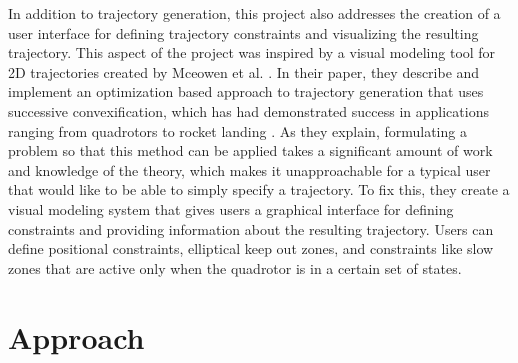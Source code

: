 \documentclass[pageno]{jpaper}
\begin{document}
In addition to trajectory generation, this project also addresses the creation of a user interface for defining trajectory constraints and visualizing the resulting trajectory. This aspect of the project was inspired by a visual modeling tool for 2D trajectories created by Mceowen et al. \cite{mceowen}. In their paper, they describe and implement an optimization based approach to trajectory generation that uses successive convexification, which has had demonstrated success in applications ranging from quadrotors to rocket landing \cite{mceowen}. As they explain, formulating a problem so that this method can be applied takes a significant amount of work and knowledge of the theory, which makes it unapproachable for a typical user that would like to be able to simply specify a trajectory. To fix this, they create a visual modeling system that gives users a graphical interface for defining constraints and providing information about the resulting trajectory. Users can define positional constraints, elliptical keep out zones, and constraints like slow zones that are active only when the quadrotor is in a certain set of states.

\section{Approach}
\end{document}
